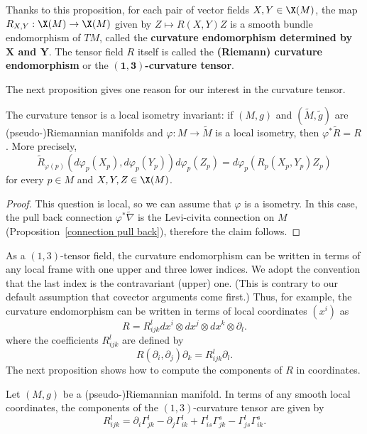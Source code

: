 Thanks to this proposition, for each pair of vector fields $X,Y\in\X(M)$, the map $R_{X,Y}:\X(M)\to\X(M)$ given by $Z\mapsto R(X,Y)Z$ is a smooth bundle endomorphism of $TM$, called the \textbf{curvature endomorphism determined by $\bm{X}$ and $\bm{Y}$}. The tensor field $R$ itself is called the \textbf{(Riemann) curvature endomorphism} or the \textbf{$\bm{(1,3)}$-curvature tensor}.\par
The next proposition gives one reason for our interest in the curvature tensor.
\begin{proposition}
The curvature tensor is a local isometry invariant: if $(M,g)$ and $(\widetilde{M},\tilde{g})$ are (pseudo-)Riemannian manifolds and $\varphi:M\to\widetilde{M}$ is a local isometry, then $\varphi^*\tilde{R}=R$. More precisely,
\[\tilde{R}_{\varphi(p)}(d\varphi_p(X_p),d\varphi_p(Y_p))d\varphi_p(Z_p)=d\varphi_p(R_p(X_p,Y_p)Z_p)\]
for every $p\in M$ and $X,Y,Z\in\X(M)$.
\end{proposition}
\begin{proof}
This question is local, so we can assume that $\varphi$ is a isometry. In this case, the pull back connection $\varphi^*\widetilde{\nabla}$ is the Levi-civita connection on $M$ (Proposition~\ref{connection pull back}), therefore the claim follows. 
\end{proof}
As a $(1,3)$-tensor field, the curvature endomorphism can be written in terms of any local frame with one upper and three lower indices. We adopt the convention that the last index is the contravariant (upper) one. (This is contrary to our default assumption that covector arguments come first.) Thus, for example, the curvature endomorphism can be written in terms of local coordinates $(x^i)$ as
\[R=R_{ijk}^{l}dx^i\otimes dx^j\otimes dx^k\otimes\partial_l.\]
where the coefficients $R_{ijk}^l$ are defined by
\[R(\partial_i,\partial_j)\partial_k=R_{ijk}^l\partial_l.\]
The next proposition shows how to compute the components of $R$ in coordinates.
\begin{proposition}
Let $(M,g)$ be a (pseudo-)Riemannian manifold. In terms of any smooth local coordinates, the components of the $(1,3)$-curvature tensor are given by
\[R_{ijk}^l=\partial_i\Gamma_{jk}^l-\partial_j\Gamma_{ik}^l+\Gamma_{is}^l\Gamma_{jk}^s-\Gamma_{js}^l\Gamma_{ik}^s.\]
\end{proposition}
